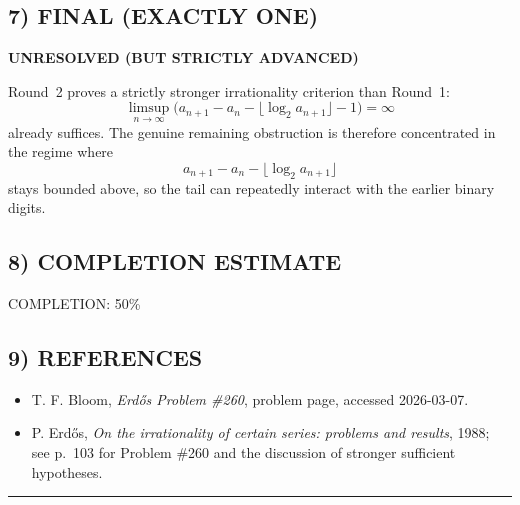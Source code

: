 \subsection*{7) FINAL (EXACTLY ONE)}

\textbf{UNRESOLVED (BUT STRICTLY ADVANCED)}

Round~2 proves a strictly stronger irrationality criterion than Round~1:
\[
\limsup_{n\to\infty}\bigl(a_{n+1}-a_n-\lfloor \log_2 a_{n+1}\rfloor-1\bigr)=\infty
\]
already suffices.  The genuine remaining obstruction is therefore concentrated in the regime where
\[
a_{n+1}-a_n-\lfloor \log_2 a_{n+1}\rfloor
\]
stays bounded above, so the tail can repeatedly interact with the earlier binary digits.

\subsection*{8) COMPLETION ESTIMATE}

COMPLETION: 50\%

\subsection*{9) REFERENCES}

\begin{itemize}
\item [EP260] T. F. Bloom, \emph{Erd\H{o}s Problem \#260}, problem page, accessed 2026-03-07.
\item [Er88c] P. Erd\H{o}s, \emph{On the irrationality of certain series: problems and results}, 1988; see p.~103 for Problem \#260 and the discussion of stronger sufficient hypotheses.
\end{itemize}

\bigskip
\hrule
\bigskip

